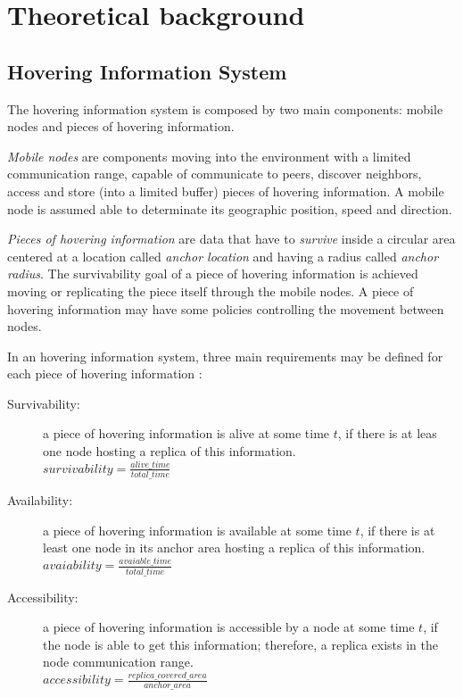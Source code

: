 \section{Theoretical background}

\subsection{Hovering Information System}

The hovering information system is composed by two main components: mobile
nodes and pieces of hovering information.

\emph{Mobile nodes} are components moving into the environment with a limited
communication range, capable of communicate to peers, discover neighbors,
access and store (into a limited buffer) pieces of
hovering information. A mobile node is assumed able to determinate its
geographic position, speed and direction.

\emph{Pieces of hovering information} are data that have to \emph{survive}
inside a circular area centered at a location called \emph{anchor location} and
having a radius called \emph{anchor radius}. The survivability goal of a piece
of hovering information is achieved moving or replicating the piece itself
through the mobile nodes. A piece of hovering information may have some
policies controlling the movement between nodes.

In an hovering information system, three main requirements may be defined for each
piece of hovering information \cite{hover}:
\begin{description}
	\item[Survivability:] a piece of hovering information is alive at some time
		$t$, if there is at leas one node hosting a replica of this information.
		\\
		$survivability = \frac{alive\_time}{total\_time}$
	\item[Availability:] a piece of hovering information is available at some time
		$t$, if there is at least one node in its anchor area hosting a replica of
		this information.
		\\
		$avaiability = \frac{avaiable\_time}{total\_time}$
	\item[Accessibility:] a piece of hovering information is accessible by a node
		at some time $t$, if the node is able to get this information; therefore, a
		replica exists in the node communication range.
		\\
		$accessibility = \frac{replica\_covered\_area}{anchor\_area}$
\end{description}

